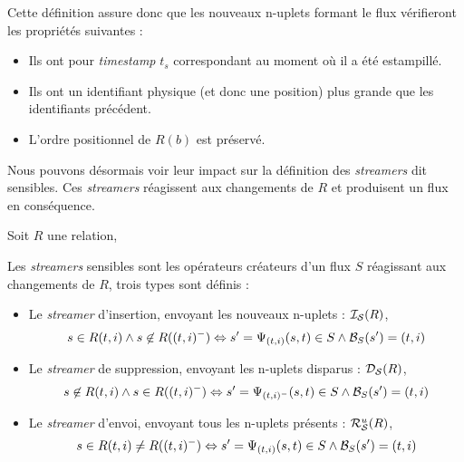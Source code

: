 Cette définition assure donc que les nouveaux n-uplets formant le flux vérifieront les propriétés suivantes : 
\begin{itemize}
 \item Ils ont pour \textit{timestamp} $t_s$ correspondant au moment où il a été estampillé.
 \item Ils ont un identifiant physique (et donc une position) plus grande que les identifiants précédent.
 \item L'ordre positionnel de $R(b)$ est préservé.
\end{itemize}
Nous pouvons désormais voir leur impact sur la définition des \textit{streamers} dit sensibles. Ces \textit{streamers} réagissent aux changements de $R$ et produisent un flux en conséquence.
\begin{defi}
    Soit $R$ une relation,

    Les \textit{streamers} sensibles sont les opérateurs créateurs d'un flux $S$ réagissant aux changements de $R$, trois types sont définis :
\begin{itemize}
 \item Le \textit{streamer} d'insertion, envoyant les nouveaux n-uplets : $\mathcal{I_S}(R)$, $$s\in R(t,i) \wedge s\not\in R((t,i)^-) \Leftrightarrow s'=\Psi_{(t,i)}(s,t)\in S \wedge \mathcal{B}_S(s') = (t,i)$$
 \item Le \textit{streamer} de suppression, envoyant les n-uplets disparus : $\mathcal{D_S}(R)$, $$s\not\in R(t,i) \wedge s\in R((t,i)^-) \Leftrightarrow s'=\Psi_{(t,i)^-}(s,t)\in S \wedge \mathcal{B}_S(s') = (t,i)$$
 \item Le \textit{streamer} d'envoi, envoyant tous les n-uplets présents : $\mathcal{R}_{\mathcal S}^u(R)$, $$s\in R(t,i) \neq R((t,i)^-) \Leftrightarrow s'=\Psi_{(t,i)}(s,t)\in S \wedge \mathcal{B}_S(s') = (t,i)$$
\end{itemize}
\end{defi}

